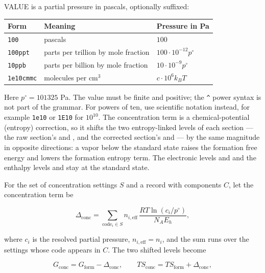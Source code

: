 VALUE is a partial pressure in pascals, optionally suffixed:

\begin{center}
\begin{tabular}{@{}lll@{}}
\toprule
\textbf{Form} & \textbf{Meaning} & \textbf{Pressure in Pa} \\
\midrule
\texttt{100} & pascals & $100$ \\
\texttt{100ppt} & parts per trillion by mole fraction & $100\cdot10^{-12}p^\circ$ \\
\texttt{10ppb} & parts per billion by mole fraction & $10\cdot10^{-9}p^\circ$ \\
\texttt{1e10cmmc} & molecules per cm$^3$ & $c\cdot10^{6}k_B T$ \\
\bottomrule
\end{tabular}
\end{center}

Here $p^\circ = 101325$ Pa. The value must be finite and positive; the
\texttt{\^{}} power syntax is not part of the grammar. For powers of ten, use
scientific notation instead, for example \texttt{1e10} or \texttt{1E10} for
$10^{10}$. The concentration term
is a chemical-potential (entropy) correction, so it shifts the two
entropy-linked levels of each section — the raw section's  and
, and the corrected section's  and  — by the
same magnitude in opposite directions: a vapor below the standard state
raises the formation free energy and lowers the formation entropy term. The
electronic levels  and  and the enthalpy levels 
and  stay at the standard state.

For the set of concentration settings $S$ and a record with components $C$,
let the concentration term be

\begin{equation}
\Delta_{\mathrm{conc}} = \sum_{\text{code}_i \in S} n_{i,\mathrm{eff}}\,
  \frac{R T \ln(c_i/p^\circ)}{N_A E_h},
\end{equation}

where $c_i$ is the resolved partial pressure, $n_{i,\mathrm{eff}} = n_i$, and
the sum runs over the settings whose code appears in $C$. The two shifted
levels become

\begin{equation}
G_{\mathrm{conc}} = G_{\mathrm{form}} - \Delta_{\mathrm{conc}},
\qquad
T S_{\mathrm{conc}} = T S_{\mathrm{form}} + \Delta_{\mathrm{conc}},
\end{equation}


